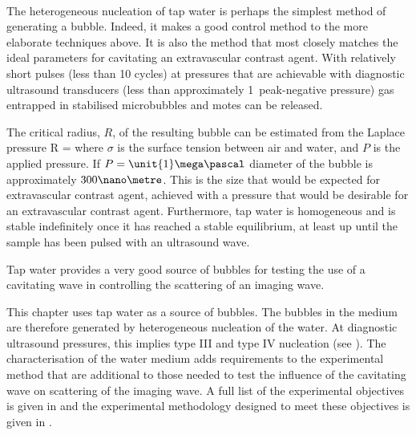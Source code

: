 {\item[Heterogeneous nucleation of tap water:]\hfill \\
  The heterogeneous nucleation of tap water is perhaps the simplest method of generating a bubble.
  Indeed, it makes a good control method to the more elaborate techniques above.
  It is also the method that most closely matches the ideal parameters for cavitating an extravascular contrast agent.
  With relatively short pulses (less than 10 cycles) at pressures that are achievable with diagnostic ultrasound transducers 
  (less than approximately \unit{1}\mega\pascal\ peak-negative pressure)
  gas entrapped in stabilised microbubbles and motes can be released.
  
  The critical radius, $R$, of the resulting bubble can be estimated from the Laplace pressure
  \eq
  {
    R = 
  }
  where $\sigma$ is the surface tension between air and water,
  and $P$ is the applied pressure. 
  If $P = \unit{1}\mega\pascal$ diameter of the bubble is approximately $300\nano\metre$.
  This is the size that would be expected for extravascular contrast agent,
  achieved with a pressure that would be desirable for an extravascular contrast agent.
  Furthermore, tap water is homogeneous and is stable indefinitely once it has reached a stable equilibrium,
  at least up until the sample has been pulsed with an ultrasound wave.
  
  Tap water provides a very good source of bubbles for testing the use of a cavitating wave in controlling the scattering of an imaging wave.
}  
This chapter uses tap water as a source of bubbles.
The bubbles in the medium are therefore generated by heterogeneous nucleation of the water.
At diagnostic ultrasound pressures, 
this implies type III and type IV nucleation (see  ).
The characterisation of the water medium adds 
requirements to the experimental method
that are additional to those needed to test the influence of the cavitating wave on scattering of the imaging wave.
A full list of the experimental objectives is given in  
and the experimental methodology designed to meet these objectives is given in .

